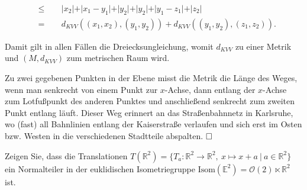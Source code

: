 \documentclass[11pt]{book}
\numberwithin{dummy}{section}
\theoremstyle{nonumberbreak}
\newenvironment{prob}[1][]{\ifthenelse{\equal{#1}{}}{\problem}{\problem[#1]}\rm}{\endproblem}
\newenvironment{sol}[1][]{\ifthenelse{\equal{#1}{}}{\solution}{\solution[#1]}\rm}{\endsolution}
\newcommand{\E}{\mathbb{E}}
\newcommand{\R}{\mathbb{R}}
\newcommand{\la}{\longrightarrow}
\begin{document}
\begin{spacing}{1.4}
\begin{prob}
\begin{sol}
\begin{compactenum}
\begin{compactenum}
\begin{compactenum}
\begin{alignat*}{5}
&\leqslant&& \ \  \vert x_2\vert + \vert x_1-y_1\vert + \vert y_2\vert + \vert y_2\vert + \vert y_1-z_1\vert + \vert z_2\vert \\
&=&& \ \ d_{KVV}((x_1,x_2),(y_1,y_2)) + d_{KVV}((y_1,y_2),(z_1,z_2)).
\end{alignat*}
\end{compactenum}
\end{compactenum}
Damit gilt in allen Fällen die Dreiecksungleichung, womit $d_{KVV}$ zu einer Metrik und $(M,d_{KVV})$ zum metrischen Raum wird.
\end{compactenum}
Zu zwei gegebenen Punkten in der Ebene misst die Metrik die Länge des Weges, wenn man senkrecht von einem Punkt zur $x$-Achse, dann entlang der $x$-Achse zum Lotfußpunkt des anderen Punktes und anschließend senkrecht zum zweiten Punkt entlang läuft. Dieser Weg erinnert an das Straßenbahnnetz in Karlsruhe, wo (fast) all Bahnlinien entlang der Kaiserstraße verlaufen und sich erst im Osten bzw. Westen in die verschiedenen Stadtteile abspalten. $\hfill \Box$



\end{sol}



\end{prob}




\begin{prob}   %
Zeigen Sie, dass die Translationen $T(\R^2) =\{T_a: \R^2 \la \R^2, \ x \mapsto x+a \ \vert \ a \in \R^2\}$ ein Normalteiler in der euklidischen Isometriegruppe $\mathrm{Isom}(\E^2)=\mathcal{O}(2) \ltimes \R^2$ ist.


\end{prob}
\end{spacing}
\end{document}
